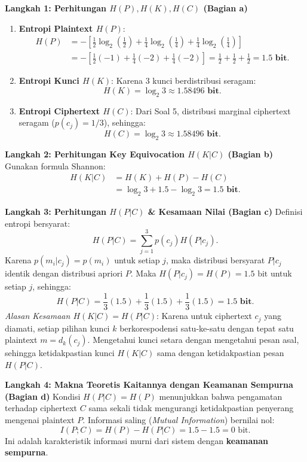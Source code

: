 \documentclass[11pt,a4paper]{article}
\begin{document}
\noindent\textbf{Langkah 1: Perhitungan $H(P), H(K), H(C)$ (Bagian a)}
\begin{enumerate}
    \item \textbf{Entropi Plaintext $H(P)$}:
    \begin{align*}
    H(P) &= - \left[ \frac{1}{2}\log_2\left(\frac{1}{2}\right) + \frac{1}{4}\log_2\left(\frac{1}{4}\right) + \frac{1}{4}\log_2\left(\frac{1}{4}\right) \right] \\
    &= - \left[ \frac{1}{2}(-1) + \frac{1}{4}(-2) + \frac{1}{4}(-2) \right] = \frac{1}{2} + \frac{1}{2} + \frac{1}{2} = \mathbf{1.5\text{ bit}}.
    \end{align*}
    \item \textbf{Entropi Kunci $H(K)$}:
    Karena 3 kunci berdistribusi seragam:
    \[
    H(K) = \log_2 3 \approx \mathbf{1.58496\text{ bit}}.
    \]
    \item \textbf{Entropi Ciphertext $H(C)$}:
    Dari Soal 5, distribusi marginal ciphertext seragam ($p(c_j) = 1/3$), sehingga:
    \[
    H(C) = \log_2 3 \approx \mathbf{1.58496\text{ bit}}.
    \]
\end{enumerate}

\noindent\textbf{Langkah 2: Perhitungan Key Equivocation $H(K|C)$ (Bagian b)}
Gunakan formula Shannon:
\begin{align*}
H(K|C) &= H(K) + H(P) - H(C) \\
&= \log_2 3 + 1.5 - \log_2 3 = \mathbf{1.5\text{ bit}}.
\end{align*}

\noindent\textbf{Langkah 3: Perhitungan $H(P|C)$ \& Kesamaan Nilai (Bagian c)}
Definisi entropi bersyarat:
\[
H(P|C) = \sum_{j=1}^3 p(c_j) H(P|c_j).
\]
Karena $p(m_i|c_j) = p(m_i)$ untuk setiap $j$, maka distribusi bersyarat $P|c_j$ identik dengan distribusi apriori $P$.
Maka $H(P|c_j) = H(P) = 1.5\text{ bit}$ untuk setiap $j$, sehingga:
\[
H(P|C) = \frac{1}{3}(1.5) + \frac{1}{3}(1.5) + \frac{1}{3}(1.5) = \mathbf{1.5\text{ bit}}.
\]
\textit{Alasan Kesamaan $H(K|C) = H(P|C)$}: Karena untuk ciphertext $c_j$ yang diamati, setiap pilihan kunci $k$ berkorespodensi satu-ke-satu dengan tepat satu plaintext $m = d_k(c_j)$. Mengetahui kunci setara dengan mengetahui pesan asal, sehingga ketidakpastian kunci $H(K|C)$ sama dengan ketidakpastian pesan $H(P|C)$.

\noindent\textbf{Langkah 4: Makna Teoretis Kaitannya dengan Keamanan Sempurna (Bagian d)}
Kondisi $H(P|C) = H(P)$ menunjukkan bahwa pengamatan terhadap ciphertext $C$ sama sekali tidak mengurangi ketidakpastian penyerang mengenai plaintext $P$. Informasi saling (\textit{Mutual Information}) bernilai nol:
\[
I(P; C) = H(P) - H(P|C) = 1.5 - 1.5 = 0\text{ bit}.
\]
Ini adalah karakteristik informasi murni dari sistem dengan \textbf{keamanan sempurna}.
\end{document}
